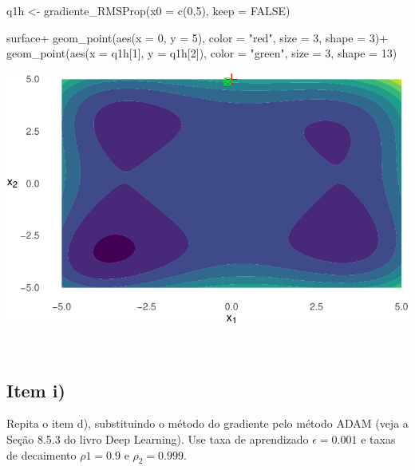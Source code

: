 \documentclass[
  a4paperpaper,
]{article}
\newenvironment{Shaded}{\begin{snugshade}}{\end{snugshade}}
\newcommand{\AttributeTok}[1]{\textcolor[rgb]{0.40,0.45,0.13}{#1}}
\newcommand{\ConstantTok}[1]{\textcolor[rgb]{0.56,0.35,0.01}{#1}}
\newcommand{\DecValTok}[1]{\textcolor[rgb]{0.68,0.00,0.00}{#1}}
\newcommand{\FunctionTok}[1]{\textcolor[rgb]{0.28,0.35,0.67}{#1}}
\newcommand{\NormalTok}[1]{\textcolor[rgb]{0.00,0.23,0.31}{#1}}
\newcommand{\OtherTok}[1]{\textcolor[rgb]{0.00,0.23,0.31}{#1}}
\newcommand{\SpecialCharTok}[1]{\textcolor[rgb]{0.37,0.37,0.37}{#1}}
\newcommand{\StringTok}[1]{\textcolor[rgb]{0.13,0.47,0.30}{#1}}
\begin{document}
\begin{Shaded}
\begin{Highlighting}[]
\NormalTok{q1h }\OtherTok{\textless{}{-}} \FunctionTok{gradiente\_RMSProp}\NormalTok{(}\AttributeTok{x0 =} \FunctionTok{c}\NormalTok{(}\DecValTok{0}\NormalTok{,}\DecValTok{5}\NormalTok{), }\AttributeTok{keep =} \ConstantTok{FALSE}\NormalTok{)}

\NormalTok{surface}\SpecialCharTok{+}
  \FunctionTok{geom\_point}\NormalTok{(}\FunctionTok{aes}\NormalTok{(}\AttributeTok{x =} \DecValTok{0}\NormalTok{, }\AttributeTok{y =} \DecValTok{5}\NormalTok{), }\AttributeTok{color =} \StringTok{"red"}\NormalTok{, }\AttributeTok{size =} \DecValTok{3}\NormalTok{, }\AttributeTok{shape =} \DecValTok{3}\NormalTok{)}\SpecialCharTok{+}
  \FunctionTok{geom\_point}\NormalTok{(}\FunctionTok{aes}\NormalTok{(}\AttributeTok{x =}\NormalTok{ q1h[}\DecValTok{1}\NormalTok{], }\AttributeTok{y =}\NormalTok{ q1h[}\DecValTok{2}\NormalTok{]), }\AttributeTok{color =} \StringTok{"green"}\NormalTok{, }\AttributeTok{size =} \DecValTok{3}\NormalTok{, }\AttributeTok{shape =} \DecValTok{13}\NormalTok{)}
\end{Highlighting}
\end{Shaded}

\includegraphics{lista3-resolucao_files/figure-pdf/q1h-1.pdf}

~

\subsection{Item i)}\label{item-i}

Repita o item d), substituindo o método do gradiente pelo método ADAM
(veja a Seção 8.5.3 do livro Deep Learning). Use taxa de aprendizado
\(\epsilon = 0.001\) e taxas de decaimento \(\rho1 = 0.9\) e
\(\rho_2 = 0.999\).

~
\end{document}
